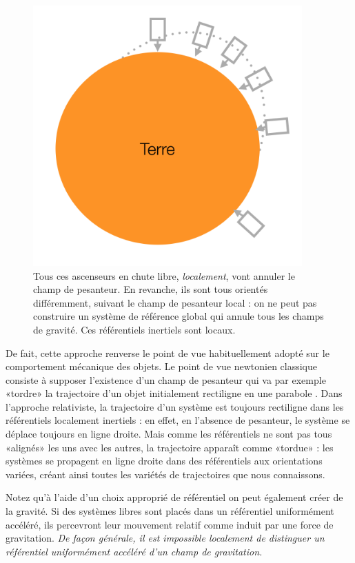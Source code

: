 \begin{figure}[htbp]
	\centering
		\includegraphics[height=10cm]{figs/ascradial.png}
	\caption[Référentiels localement inertiels]{Tous ces ascenseurs en chute libre, \textit{localement}, vont annuler le champ de pesanteur. En revanche, ils sont tous orientés différemment, suivant le champ de pesanteur local : on ne peut pas construire un système de référence global qui annule tous les champs de gravité. Ces référentiels inertiels sont locaux.}
	\label{f:ascradial}
\end{figure}

De fait, cette approche renverse le point de vue habituellement adopté sur le comportement mécanique des objets. Le point de vue newtonien classique consiste à supposer l'existence d'un champ de pesanteur qui va par exemple «tordre» la trajectoire d'un objet initialement rectiligne en une parabole . Dans l'approche relativiste, la trajectoire d'un système est toujours rectiligne dans les référentiels localement inertiels : en effet, en l'absence de pesanteur, le système se déplace toujours en ligne droite. Mais comme les référentiels ne sont pas tous «alignés» les uns avec les autres, la trajectoire apparaît comme «tordue» : les systèmes se propagent en ligne droite dans des référentiels aux orientations variées, créant ainsi toutes les variétés de trajectoires que nous connaissons. 


Notez qu'à l'aide d'un choix approprié de référentiel on peut également créer de la gravité. Si des systèmes libres sont placés dans un référentiel uniformément accéléré, ils percevront leur mouvement relatif comme induit par une force de gravitation. \textit{De façon générale, il est impossible localement de distinguer un référentiel uniformément accéléré d'un champ de gravitation.}


